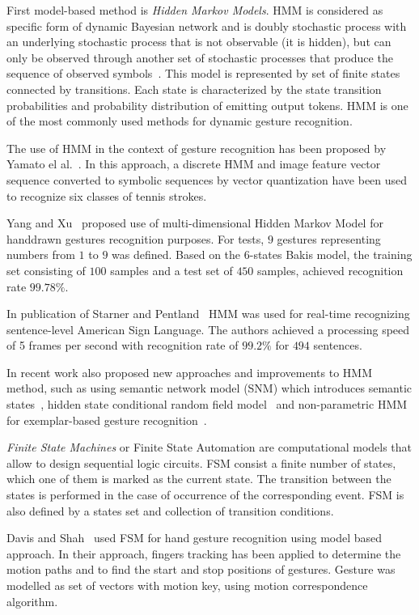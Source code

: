 First model-based method is \emph{Hidden Markov Models}. HMM is considered as specific form of dynamic Bayesian network and is doubly stochastic process with an underlying stochastic process that is not observable (it is hidden), but can only be observed through another set of stochastic processes that produce the sequence of observed symbols~\cite{RabinerHmmIntro}. This model is represented by set of finite states connected by transitions. Each state is characterized by the state transition probabilities and probability distribution of emitting output tokens. HMM is one of the most commonly used methods for dynamic gesture recognition.

The use of HMM in the context of gesture recognition has been proposed by Yamato el al.~\cite{YamatoComputerVision}. In this approach, a discrete HMM and image feature vector sequence converted to symbolic sequences by vector quantization have been used to recognize six classes of tennis strokes.

Yang and Xu~\cite{Yang_1994_329} proposed use of multi-dimensional Hidden Markov Model for handdrawn gestures recognition purposes. For tests, $9$ gestures representing numbers from $1$ to $9$ was defined. Based on the $6$-states Bakis model, the training set consisting of $100$ samples and a test set of $450$ samples, achieved recognition rate $99.78\%$.

In publication of Starner and Pentland~\cite{StarnerComputerVision} HMM was used for real-time recognizing sentence-level American Sign Language. The authors achieved a processing speed of 5 frames per second with recognition rate of $99.2\%$ for $494$ sentences.

In recent work also proposed new approaches and improvements to HMM method, such as using semantic network model (SNM) which introduces semantic states~\cite{RajkoComputerVision}, hidden state conditional random field model~\cite{WangComputerVision} and non-parametric HMM for exemplar-based gesture recognition~\cite{Elgammal:2003:LDE:1965841.1965916}.

\emph{Finite State Machines} or Finite State Automation are computational models that allow to design sequential logic circuits. FSM consist a finite number of states, which one of them is marked as the current state. The transition between the states is performed in the case of occurrence of the corresponding event. FSM is also defined by a states set and collection of transition conditions.

Davis and Shah~\cite{Davis94visualgesture} used FSM for hand gesture recognition using model based approach. In their approach, fingers tracking has been applied to determine the motion paths and to find the start and stop positions of gestures. Gesture was modelled as set of vectors with motion key, using motion correspondence algorithm.


